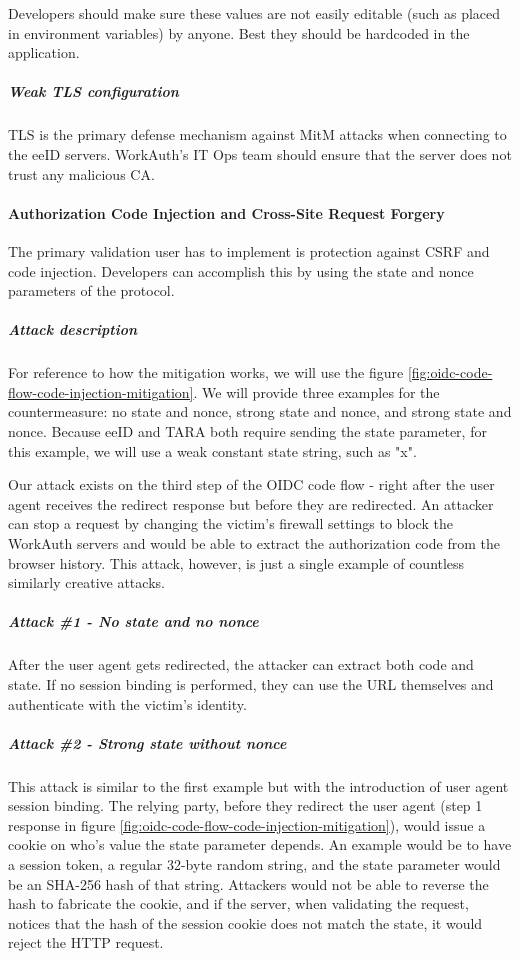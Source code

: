 Developers should make sure these values are not easily editable (such as placed in environment variables) by anyone. Best they should be hardcoded in the application.

\subparagraph{Weak TLS configuration}

TLS is the primary defense mechanism against MitM attacks when connecting to the eeID servers. WorkAuth's IT Ops team should ensure that the server does not trust any malicious CA.

\paragraph{Authorization Code Injection and Cross-Site Request Forgery}

The primary validation user has to implement is protection against CSRF and code injection. Developers can accomplish this by using the state and nonce parameters of the protocol.

\subparagraph{Attack description}

For reference to how the mitigation works, we will use the figure \ref{fig:oidc-code-flow-code-injection-mitigation}. We will provide three examples for the countermeasure: no state and nonce, strong state and nonce, and strong state and nonce. Because eeID and TARA both require sending the {state} parameter, for this example, we will use a weak constant state string, such as "x".

Our attack exists on the third step of the OIDC code flow - right after the user agent receives the redirect response but before they are redirected. An attacker can stop a request by changing the victim's firewall settings to block the WorkAuth servers and would be able to extract the authorization code from the browser history. This attack, however, is just a single example of countless similarly creative attacks.

\subparagraph{Attack \#1 - No state and no nonce}

After the user agent gets redirected, the attacker can extract both code and state. If no session binding is performed, they can use the URL themselves and authenticate with the victim's identity.

\subparagraph{Attack \#2 - Strong state without nonce}

This attack is similar to the first example but with the introduction of user agent session binding. The relying party, before they redirect the user agent (step 1 response in figure \ref{fig:oidc-code-flow-code-injection-mitigation}), would issue a cookie on who's value the state parameter depends. An example would be to have a session token, a regular 32-byte random string, and the state parameter would be an {SHA-256} hash of that string. Attackers would not be able to reverse the hash to fabricate the cookie, and if the server, when validating the request, notices that the hash of the session cookie does not match the state, it would reject the HTTP request.

